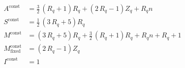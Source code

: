 \begin{align*}
A^{\mathrm{const}} &= \frac{3}{2} \, {\left(R_{q} + 1\right)} R_{q} + {\left(2 \, R_{q} - 1\right)} Z_{q} + R_{q} n \\
S^{\mathrm{const}} &= \frac{1}{2} \, {\left(3 \, R_{q} + 5\right)} R_{q} \\
M^{\mathrm{const}} &= {\left(3 \, R_{q} + 5\right)} R_{q} + \frac{3}{2} \, {\left(R_{q} + 1\right)} R_{q} + R_{q} n + R_{q} + 1 \\
M_{\mathrm{fixed}}^{\mathrm{const}} &= {\left(2 \, R_{q} - 1\right)} Z_{q} \\
I^{\mathrm{const}} &= 1 
\end{align*}
